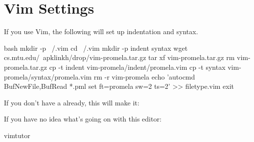 \section{Vim Settings}

If you use Vim, the following will set up indentation and syntax.
\begin{code}
bash
mkdir -p ~/.vim
cd ~/.vim
mkdir -p indent syntax
wget cs.mtu.edu/~apklinkh/drop/vim-promela.tar.gz
tar xf vim-promela.tar.gz
rm vim-promela.tar.gz
cp -t indent vim-promela/indent/promela.vim
cp -t syntax vim-promela/syntax/promela.vim
rm -r vim-promela
echo 'autocmd BufNewFile,BufRead *.pml set ft=promela sw=2 ts=2' >> filetype.vim
exit
\end{code}

If you don't have a  already, this will make it:

If you have no idea what's going on with this editor:
\begin{code}
vimtutor
\end{code}



